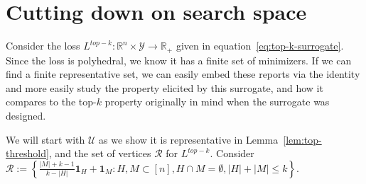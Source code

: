 \documentclass[12pt]{article}
\newcommand{\reals}{\mathbb{R}}
\newcommand{\R}{\mathcal{R}}
\newcommand{\U}{\mathcal{U}}
\newcommand{\Y}{\mathcal{Y}}
\begin{document}
\section{Cutting down on search space}
Consider the loss $L^{top-k} : \reals^n \times \Y \to \reals_+$ given in equation~\eqref{eq:top-k-surrogate}.
Since the loss is polyhedral, we know it has a finite set of minimizers.
If we can find a finite representative set, we can easily embed these reports via the identity and more easily study the property elicited by this surrogate, and how it compares to the top-$k$ property originally in mind when the surrogate was designed.

We will start with $\U$ as we show it is representative in Lemma~\ref{lem:top-threshold}, and the set of vertices $\R$ for $L^{top-k}$.
Consider $\R := \left\{ \frac{|M| + k -1}{k - |H|} \mathbf{1}_H + \mathbf{1}_M : H, M \subset [n], H\cap M = \emptyset, |H| + |M| \leq k \right\}$.
\end{document}
